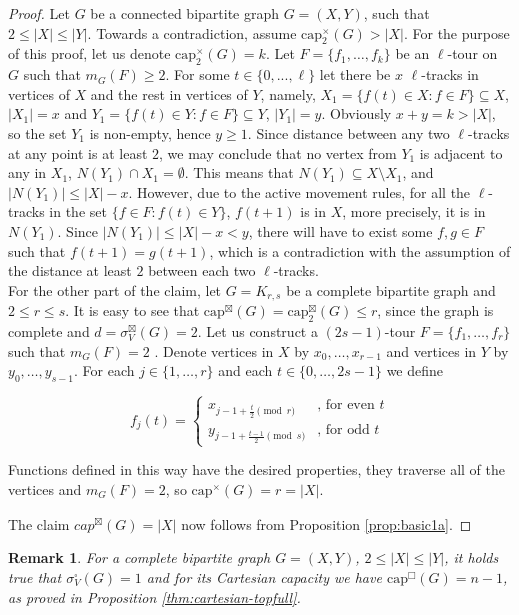 \documentclass{article}
\newtheorem{remark}[theorem]{Remark}
\newcommand{\dcap}[2]{\mathrm{cap}^{\times}_{#1}(#2)}
\newcommand{\scap}[2]{\mathrm{cap}^{\boxtimes}_{#1}(#2)}
\newcommand{\ccap}[2]{\mathrm{cap}^{\mathbin{\Box}}_{#1}(#2)}
\begin{document}
\begin{proof}
Let $G$ be a connected bipartite graph $G=(X,Y)$, such that $2\leq|X| \leq |Y|$. Towards a contradiction, assume $\dcap{2}{G}>|X|$. For the purpose of this proof, let us denote $\dcap{2}{G}=k$. Let $F=\{f_1,\ldots,f_k\}$ be an $\ell$-tour on $G$ such that $m_G(F)\geq 2$. For some $t\in\{0,...,\ell\}$ let there be $x$ $\ell$-tracks in vertices of $X$ and the rest in vertices of $Y$, namely, $X_1=\{f(t)\in X:f\in F\}\subseteq X$, $|X_1|=x$ and $Y_1=\{f(t)\in Y:f\in F\}\subseteq Y$, $|Y_1|=y$. Obviously $x+y=k>|X|$, so the set $Y_1$ is non-empty, hence $y\geq 1$. Since distance between any two $\ell$-tracks at any point is at least $2$, we may conclude that no vertex from $Y_1$ is adjacent to any in $X_1$, $N(Y_1)\cap X_1=\emptyset$. This means that $N(Y_1)\subseteq X\setminus X_1$, and $|N(Y_1)|\leq |X|-x$. However, due to the active movement rules, for all the $\ell$-tracks in the set $\{f\in F:f(t)\in Y\}$, $f(t+1)$ is in $X$, more precisely, it is in $N(Y_1)$. Since $|N(Y_1)|\leq |X|-x<y$, there will have to exist some $f,g\in F$ such that $f(t+1)=g(t+1)$, which is a contradiction with the assumption of the distance at least $2$ between each two $\ell$-tracks.\\


For the other part of the claim, let $G=K_{r,s}$ be a complete bipartite graph and $2\leq r \leq s$. It is easy to see that $\scap{}{G} =\scap{2}{G} \leq r$, since the graph is complete and $d=\sigma_V^{\boxtimes}(G)=2$. Let us construct a $(2s-1)$-tour $F=\{f_1,\ldots,f_r\}$ such that $m_{G}(F)= 2$ . Denote vertices in $X$ by $x_0,\ldots,x_{r-1}$ and vertices in $Y$ by $y_0,\ldots,y_{s-1}$. For each $j\in\{1,\ldots,r\}$ and each $t\in\{0,\ldots,2s-1\}$ we define

$$f_j(t)=\left\{
	\begin{array}{ll}
		x_{j-1+\frac{t}{2} \pmod r}  & \mbox{, for even } t \\
		y_{j-1+\frac{t-1}{2} \pmod s} & \mbox{, for odd } t
	\end{array}
    \right.$$

Functions defined in this way have the desired properties, they traverse all of the vertices and $m_{G}(F)= 2$, so $\dcap{}{G}=r=|X|$. 

The claim $cap^{\boxtimes}(G)=|X|$ now follows from Proposition \ref{prop:basic1a}.
\end{proof}

\begin{remark}
    For a complete bipartite graph $G=(X,Y)$, $2\leq |X| \leq |Y|$, it holds true that $\sigma_V^{\square}(G)=1$ and for its Cartesian capacity we have $\ccap{}{G}=n-1$, as proved in Proposition \ref{thm:cartesian-topfull}.
\end{remark}
\end{document}
